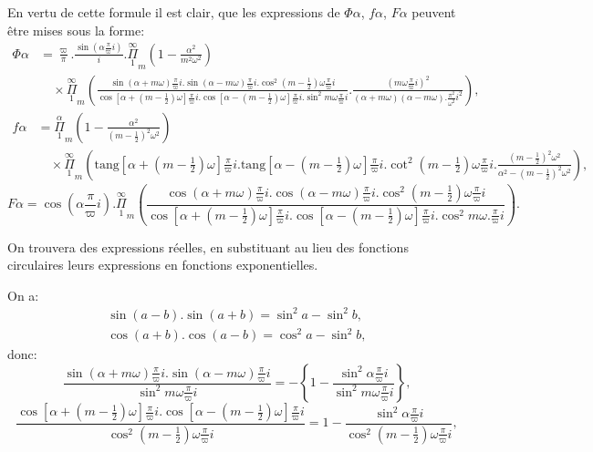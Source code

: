 \documentclass{article}
\begin{document}
En vertu de cette formule il est clair, que les expressions de $\Phi\alpha$, $f\alpha$, $F\alpha$ peuvent être mises sous la forme:
\[
\begin{aligned}
\Phi\alpha &= \frac{\varpi}{\pi}.\frac{\sin\left(\alpha\frac{\pi}{\varpi}i\right)}{i}.\overset{\infty}{\underset{1}{\Pi}}_{m}\left(1-\frac{\alpha^{2}}{m^{2}\omega^{2}}\right)\\
&\quad\times\overset{\infty}{\underset{1}{\Pi}}_{m}\left(\frac{\sin(\alpha+m\omega)\frac{\pi}{\varpi}i.\sin(\alpha-m\omega)\frac{\pi}{\varpi}i.\cos^{2}(m-\tfrac{1}{2})\omega\frac{\pi}{\varpi}i}{\cos[\alpha+(m-\tfrac{1}{2})\omega]\frac{\pi}{\varpi}i.\cos[\alpha-(m-\tfrac{1}{2})\omega]\frac{\pi}{\varpi}i.\sin^{2}m\omega\frac{\pi}{\varpi}i}.\frac{\left(m\omega\frac{\pi}{\varpi}i\right)^{2}}{(\alpha+m\omega)(\alpha-m\omega).\frac{\pi^{2}}{\omega^{2}}i^{2}}\right),
\end{aligned}
\]
\[
\begin{aligned}
f\alpha &= \overset{\alpha}{\underset{1}{\Pi}}_{m}\left(1-\frac{\alpha^{2}}{(m-\tfrac{1}{2})^{2}\omega^{2}}\right)\\
&\quad\times\overset{\infty}{\underset{1}{\Pi}}_{m}\left(\text{tang}[\alpha+(m-\tfrac{1}{2})\omega]\frac{\pi}{\varpi}i.\text{tang}[\alpha-(m-\tfrac{1}{2})\omega]\frac{\pi}{\varpi}i.\cot^{2}(m-\tfrac{1}{2})\omega\frac{\pi}{\varpi}i.\frac{(m-\tfrac{1}{2})^{2}\omega^{2}}{\alpha^{2}-(m-\tfrac{1}{2})^{2}\omega^{2}}\right),
\end{aligned}
\]
\[
F\alpha = \cos\left(\alpha\frac{\pi}{\varpi}i\right).\overset{\infty}{\underset{1}{\Pi}}_{m}\left(\frac{\cos(\alpha+m\omega)\frac{\pi}{\varpi}i.\cos(\alpha-m\omega)\frac{\pi}{\varpi}i.\cos^{2}(m-\tfrac{1}{2})\omega\frac{\pi}{\varpi}i}{\cos[\alpha+(m-\tfrac{1}{2})\omega]\frac{\pi}{\varpi}i.\cos[\alpha-(m-\tfrac{1}{2})\omega]\frac{\pi}{\varpi}i.\cos^{2}m\omega.\frac{\pi}{\varpi}i}\right).
\]

On trouvera des expressions réelles, en substituant au lieu des fonctions circulaires leurs expressions en fonctions exponentielles.

On a:
\[
\begin{gathered}
\sin(a-b).\sin(a+b) = \sin^{2}a-\sin^{2}b,\\
\cos(a+b).\cos(a-b) = \cos^{2}a-\sin^{2}b,
\end{gathered}
\]
donc:
\[
\frac{\sin(\alpha+m\omega)\frac{\pi}{\varpi}i.\sin(\alpha-m\omega)\frac{\pi}{\varpi}i}{\sin^{2}m\omega\frac{\pi}{\varpi}i} = -\left\{1-\frac{\sin^{2}\alpha\frac{\pi}{\varpi}i}{\sin^{2}m\omega\frac{\pi}{\varpi}i}\right\},
\]
\[
\frac{\cos[\alpha+(m-\tfrac{1}{2})\omega]\frac{\pi}{\varpi}i.\cos[\alpha-(m-\tfrac{1}{2})\omega]\frac{\pi}{\varpi}i}{\cos^{2}(m-\tfrac{1}{2})\omega\frac{\pi}{\varpi}i} = 1-\frac{\sin^{2}\alpha\frac{\pi}{\varpi}i}{\cos^{2}(m-\tfrac{1}{2})\omega\frac{\pi}{\varpi}i},
\]
\end{document}
